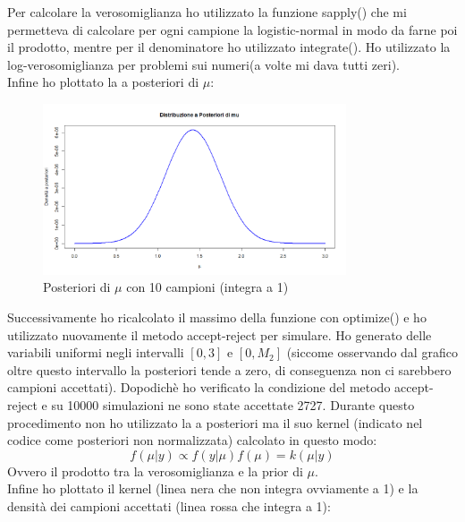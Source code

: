 \documentclass[a4paper,12pt]{article}
\begin{document}
\begin{itemize}
	Per calcolare la verosomiglianza ho utilizzato la funzione sapply() che mi permetteva di calcolare per ogni campione la logistic-normal in modo da farne poi il prodotto, mentre per il denominatore ho utilizzato integrate(). Ho utilizzato la log-verosomiglianza per problemi sui numeri(a volte mi dava tutti zeri).\\
	Infine ho plottato la a posteriori di $\mu$:
	\begin{figure}[h] %
		\centering %
		\includegraphics[width=0.8\textwidth]{post.png} %
		\caption{Posteriori di $\mu$ con 10 campioni (integra a 1)} %
		\label{fig:immagine} %
	\end{figure}
	\newpage
	Successivamente ho ricalcolato il massimo della funzione con optimize() e ho utilizzato nuovamente il metodo accept-reject per simulare. Ho generato delle variabili uniformi negli intervalli $[0,3]$ e $[0,M_2]$ (siccome osservando dal grafico oltre questo intervallo la posteriori tende a zero, di conseguenza non ci sarebbero campioni accettati). Dopodichè ho verificato la condizione del metodo accept-reject e su 10000 simulazioni ne sono state accettate 2727. Durante questo procedimento non ho utilizzato la a posteriori ma il suo kernel (indicato nel codice come posteriori non normalizzata) calcolato in questo modo:\\
	\[
	f(\mu | y) \propto f(y | \mu) f(\mu) = k(\mu | y)
	\]
	Ovvero il prodotto tra la verosomiglianza e la prior di $\mu$.\\
	Infine ho plottato il kernel (linea nera che non integra ovviamente a 1) e la densità dei campioni accettati (linea rossa che integra a 1):
	\begin{figure}[h] %
		\centering %

\end{figure}
\end{itemize}
\end{document}
